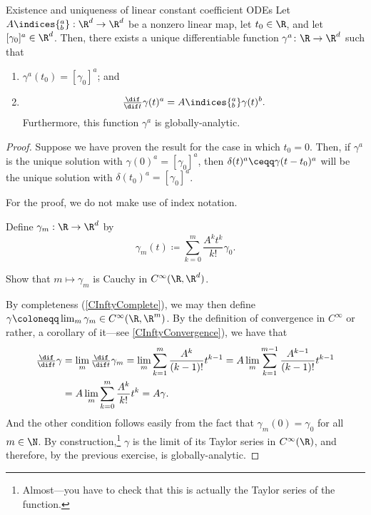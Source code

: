 \begin{thm}{Existence and uniqueness of linear constant coefficient ODEs}{}
Let $A\indices{^a_b}:\R ^d\rightarrow \R ^d$ be a nonzero linear map, let $t_0\in \R$, and let $[\gamma _0]^a\in \R ^d$.  Then, there exists a unique differentiable function $\gamma ^a\colon \R \rightarrow \R ^d$ such that
\begin{enumerate}
\item $\gamma ^a(t_0)=[\gamma _0]^a$; and
\item
\begin{equation}
\tfrac{\dif}{\dif t}\gamma (t)^a=A\indices{^a_b}\gamma (t)^b.
\end{equation}
Furthermore, this function $\gamma ^a$ is globally-analytic.
\end{enumerate}
\begin{proof}
Suppose we have proven the result for the case in which $t_0=0$.  Then, if $\gamma ^a$ is the unique solution with $\gamma (0)^a=[\gamma _0]^a$, then $\delta (t)^a\ceqq \gamma (t-t_0)^a$ will be the unique solution with $\delta (t_0)^a=[\gamma _0]^a$.

For the proof, we do not make use of index notation.

Define $\gamma _m:\R \rightarrow \R ^d$ by
\begin{equation}
\gamma _m(t)\coloneqq \sum _{k=0}^m\frac{A^kt^k}{k!}\gamma _0.
\end{equation}
\begin{exr}[breakable=false]{}{}
Show that $m\mapsto \gamma _m$ is Cauchy in $C^\infty (\R ,\R ^d)$.
\end{exr}
By completeness (\cref{CInftyComplete}), we may then define $\gamma \coloneqq \lim _m\gamma _m\in C^\infty (\R ,\R ^m)$.  By the definition of convergence in $C^\infty$ or rather, a corollary of it---see \cref{CInftyConvergence}), we have that
\begin{equation}
\begin{split}
\tfrac{\dif}{\dif t}\gamma & =\lim _m\tfrac{\dif}{\dif t}\gamma _m=\lim _m\sum _{k=1}^m\frac{A^k}{(k-1)!}t^{k-1}=A\lim _m\sum _{k=1}^{m-1}\frac{A^{k-1}}{(k-1)!}t^{k-1} \\
& =A\lim _m\sum _{k=0}^m\frac{A^k}{k!}t^k=A\gamma .
\end{split}
\end{equation}
And the other condition follows easily from the fact that $\gamma _m(0)=\gamma _0$ for all $m\in \N$.  By construction,\footnote{Almost---you have to check that this is actually the Taylor series of the function.} $\gamma$ is the limit of its Taylor series in $C^\infty (\R )$, and therefore, by the previous exercise, is globally-analytic.


\end{proof}
\end{thm}
